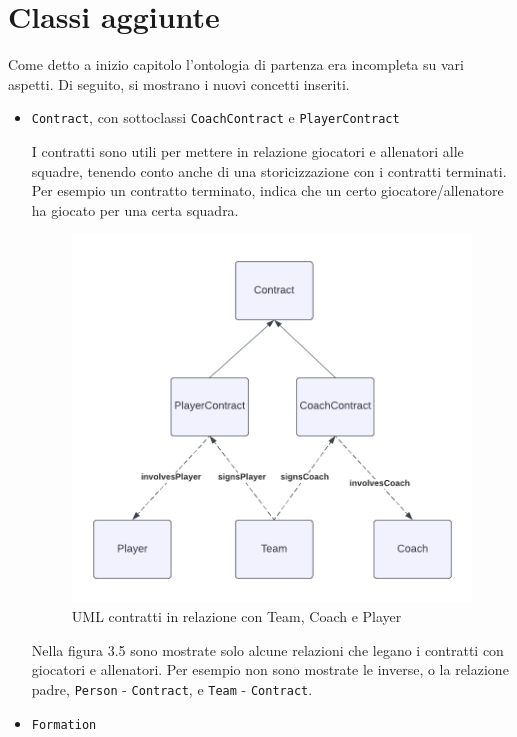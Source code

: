 \documentclass[11pt]{report} %
\begin{document}
\newpage


 \section{Classi aggiunte}

Come detto a inizio capitolo l'ontologia di partenza era incompleta su vari aspetti. Di seguito, si mostrano i nuovi concetti inseriti.

\begin{itemize}[leftmargin=*]
    \item \texttt{Contract}, con sottoclassi \texttt{CoachContract} e \texttt{PlayerContract}

    I contratti sono utili per mettere in relazione giocatori e allenatori alle squadre, tenendo conto anche di una storicizzazione con i contratti terminati. Per esempio un contratto terminato, indica che un certo giocatore/allenatore ha giocato per una certa squadra.
  
    \begin{figure}[H]
        \centering
        \includegraphics[width=0.8\linewidth]{CONTRACT.png}
        \caption{UML contratti in relazione con Team, Coach e Player}
    \end{figure}

    Nella figura 3.5 sono mostrate solo alcune relazioni che legano i contratti con giocatori e allenatori. Per esempio non sono mostrate le inverse, o la relazione padre,  \texttt{Person} - \texttt{Contract}, e \texttt{Team} - \texttt{Contract}. 

    \newpage
    
    \item \texttt{Formation}
    

\end{itemize}
\end{document}
